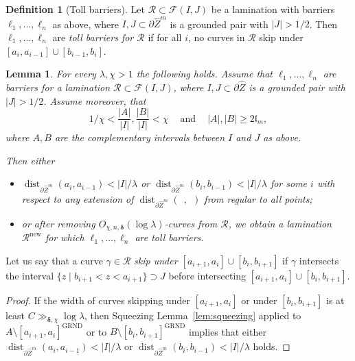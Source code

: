 \documentclass{amsart}
\renewcommand{\sp}{{\ \ }}
\newcommand{\1}{{\mathbb 1 }}
\newcommand{\Fam}{{\mathcal F}}
\newcommand\RR{\mathcal{R}}
\newcommand{\wZ}{{\widehat Z}}
\newcommand{\length}{{\mathfrak l}}
\newcommand{\GRND}{{\operatorname{GRND}}}
\newcommand\new{{\operatorname{new}}}
\newtheorem{lem}[thm]{Lemma}
\theoremstyle{remark}
\numberwithin{equation}{section}
\theoremstyle{definition}
\newtheorem{defn}[thm]{Definition}
\newcommand{\dist}{\operatorname{dist}}
\newcommand{\bdelta}{{\boldsymbol{ \delta}}}
\begin{document}
\begin{defn}[Toll barriers] 
\label{defn:barriers}
Let $\RR \subset \Fam(I,J)$  be a lamination with barriers $\ell_1,\dots, \ell_n$ as above,  where $I,J\subset \partial \wZ^m$ is a grounded pair with $|J| >1/2$. Then $\ell_1,\dots, \ell_n$ are \emph{toll barriers for $\RR$} if for all $i$, no curves in $\RR$ skip under $[a_i, a_{i-1}]\cup [b_{i-1}, b_{i}]$. 
\end{defn}


\begin{lem}
\label{lem:barr vs toll barriers}
For every $\lambda,\chi>1$ the following holds.  Assume that $\ell_1,\dots, \ell_n$ are barriers for a lamination $\RR \subset \Fam(I,J)$, where $I,J\subset \partial \wZ$ is a grounded pair with $|J| >1/2$. Assume moreover, that 
\[ 1/\chi <\frac{|A|}{|I|}, \frac{|B|}{|I|} < \chi\sp\sp\text{ and }\sp\sp  |A|,|B|\ge 2\length_{m},\]
where $A,B$ are the complementary intervals between $I$ and $J$ as above. 

Then either 
\begin{itemize}
\item $\dist_{\partial \wZ^m}(a_i,a_{i-1}) <|I|/\lambda$ or $\dist_{\partial \wZ^m}(b_i,b_{i-1}) <|I|/\lambda$ for some $i$ with respect to any extension of $\dist_{\partial \wZ^m}(\sp,\sp ) $ from regular to all points;
\item  or after removing $O_{\chi, n,\bdelta}(\log \lambda)$-curves from $\RR$, we obtain a lamination $\RR^\new$ for which  $\ell_1,\dots, \ell_n$ are toll barriers.  
\end{itemize}
\end{lem}

Let us say that a curve $\gamma\in \RR$ \emph{skip under $[a_{i+1},a_i]\cup [b_i,b_{i+1}]$} if $\gamma$ intersects the interval $\{z\mid b_{i+1} <z< a_{i+1}\}\supset J$ before intersecting $[a_{i+1},a_i]\cup [b_i,b_{i+1}]$.

\begin{proof}
If the width of curves skipping under $[a_{i+1},a_i]$ or under $[b_i,b_{i+1}]$ is at least $C\gg _{\bdelta,\chi}\log \lambda$, then Squeezing Lemma~\ref{lem:squeezing} applied to $A\setminus [a_{i+1},a_i]^\GRND$ or to $B\setminus [b_i,b_{i+1}]^\GRND$ implies that either $\dist_{\partial \wZ^m}(a_i,a_{i-1}) <|I|/\lambda$ or $\dist_{\partial \wZ^m}(b_i,b_{i-1}) <|I|/\lambda$ holds.
\end{proof}

 
 
 
 
 
 
\end{document}

